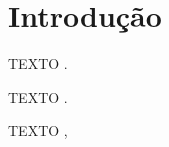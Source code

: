 \chapter{Introdução}
\label{chapter:introducao}

TEXTO
\cite{ESTATISTICACANCER}.

TEXTO
\cite{IAEMSAUDE}.

TEXTO
\cite{BREASTCANCER},

















